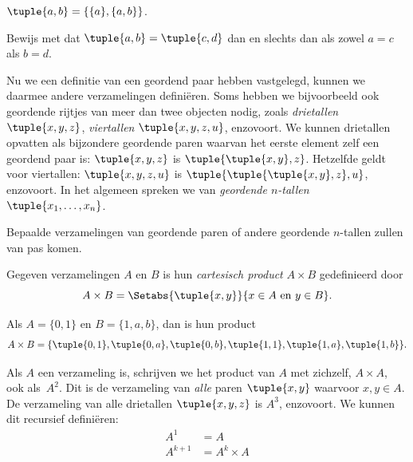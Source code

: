\documentclass[openany]{memoir}
\begin{document}
\begin{defn}
	$\tuple{a, b} = \{\{a\}, \{a, b\}\}$.
\end{defn}

\begin{prob}
	Bewijs met  dat $\tuple{a,
	b}= \tuple{c, d}$ dan en slechts dan als zowel $a = c$ als $b=d$.
\end{prob}

\begin{explain}
Nu we een definitie van een geordend paar hebben vastgelegd, kunnen we
daarmee andere verzamelingen definiëren. Soms hebben we bijvoorbeeld
ook geordende rijtjes van meer dan twee objecten nodig, zoals
\emph{drietallen} $\tuple{x, y, z}$, \emph{viertallen} $\tuple{x, y,
z, u}$, enzovoort. We kunnen drietallen opvatten als bijzondere
geordende paren waarvan het eerste element zelf een geordend paar is:
$\tuple{x, y, z}$ is $\tuple{\tuple{x, y},z}$. Hetzelfde geldt voor
viertallen: $\tuple{x,y,z,u}$ is
$\tuple{\tuple{\tuple{x,y},z},u}$, enzovoort. In het algemeen spreken
we van \emph{geordende $n$-tallen} $\tuple{x_1, \dots, x_n}$.

Bepaalde verzamelingen van geordende paren of andere geordende
$n$-tallen zullen van pas komen.
\end{explain}

\begin{defn}
Gegeven verzamelingen $A$ en $B$ is hun \emph{cartesisch product} $A
\times B$ gedefinieerd door
\[
  A \times B = \Setabs{\tuple{x, y}}{x \in A \text{ en } y \in B}.
\]
\end{defn}

\begin{ex}
Als $A = \{0, 1\}$ en $B = \{1, a, b\}$, dan is hun product
\[
A \times B = \{ \tuple{0, 1}, \tuple{0, a}, \tuple{0, b},
    \tuple{1, 1}, \tuple{1, a}, \tuple{1, b} \}.
\]
\end{ex}

\begin{ex}
Als $A$ een verzameling is, schrijven we het product van $A$ met
zichzelf, $A \times A$, ook als~$A^2$. Dit is de verzameling van
\emph{alle} paren $\tuple{x, y}$ waarvoor $x, y \in A$. De
verzameling van alle drietallen $\tuple{x, y, z}$ is $A^3$,
enzovoort. We kunnen dit recursief definiëren:
\begin{align*}
  A^1 & = A\\
  A^{k+1} & = A^k \times A
\end{align*}
\end{ex}
\end{document}
